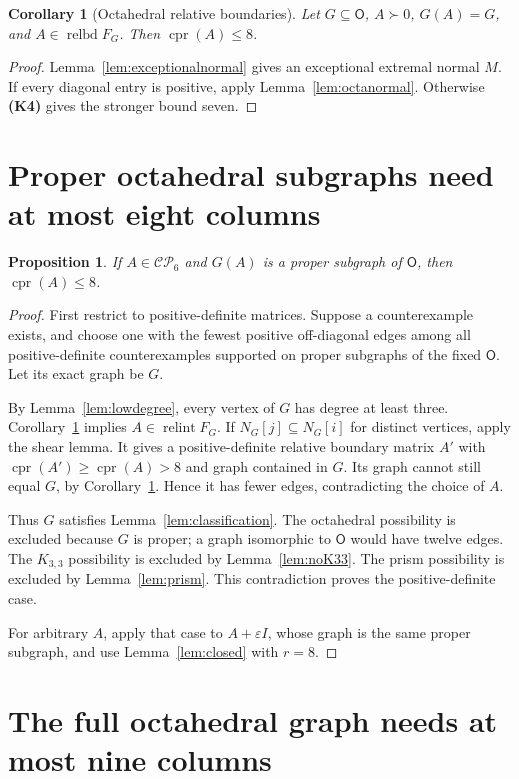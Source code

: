 \documentclass[11pt,a4paper]{article}
\newtheorem{proposition}[theorem]{Proposition}
\newtheorem{corollary}[theorem]{Corollary}
\theoremstyle{definition}
\newcommand{\CP}{\mathcal{CP}}
\newcommand{\OO}{\mathsf{O}}
\DeclareMathOperator{\cpr}{cpr}
\DeclareMathOperator{\relint}{relint}
\DeclareMathOperator{\relbd}{relbd}
\newcommand{\inputfact}[1]{\textbf{(#1)}}
\begin{document}
\begin{corollary}[Octahedral relative boundaries]\label{cor:octaboundary}
Let $G\subseteq\OO$, $A\succ0$, $G(A)=G$, and $A\in\relbd F_G$. Then $\cpr(A)\leq8$.
\end{corollary}
\begin{proof}
Lemma~\ref{lem:exceptionalnormal} gives an exceptional extremal normal $M$. If every diagonal entry is positive, apply Lemma~\ref{lem:octanormal}. Otherwise \inputfact{K4} gives the stronger bound seven.
\end{proof}

\section{Proper octahedral subgraphs need at most eight columns}

\begin{proposition}\label{prop:properocta}
If $A\in\CP_6$ and $G(A)$ is a proper subgraph of $\OO$, then $\cpr(A)\leq8$.
\end{proposition}
\begin{proof}
First restrict to positive-definite matrices. Suppose a counterexample exists, and choose one with the fewest positive off-diagonal edges among all positive-definite counterexamples supported on proper subgraphs of the fixed $\OO$. Let its exact graph be $G$.

By Lemma~\ref{lem:lowdegree}, every vertex of $G$ has degree at least three. Corollary~\ref{cor:octaboundary} implies $A\in\relint F_G$. If $N_G[j]\subseteq N_G[i]$ for distinct vertices, apply the shear lemma. It gives a positive-definite relative boundary matrix $A'$ with $\cpr(A')\geq\cpr(A)>8$ and graph contained in $G$. Its graph cannot still equal $G$, by Corollary~\ref{cor:octaboundary}. Hence it has fewer edges, contradicting the choice of $A$.

Thus $G$ satisfies Lemma~\ref{lem:classification}. The octahedral possibility is excluded because $G$ is proper; a graph isomorphic to $\OO$ would have twelve edges. The $K_{3,3}$ possibility is excluded by Lemma~\ref{lem:noK33}. The prism possibility is excluded by Lemma~\ref{lem:prism}. This contradiction proves the positive-definite case.

For arbitrary $A$, apply that case to $A+\varepsilon I$, whose graph is the same proper subgraph, and use Lemma~\ref{lem:closed} with $r=8$.
\end{proof}

\section{The full octahedral graph needs at most nine columns}
\end{document}
